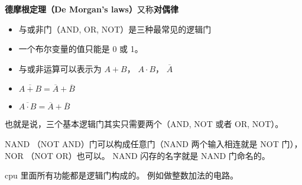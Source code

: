 
\begin{issues}
\issueDraft
\end{issues}

\textbf{德摩根定理（De Morgan's laws）}又称\textbf{对偶律}

\begin{itemize}
\item 与或非门（AND, OR, NOT）是三种最常见的逻辑门
\item 一个布尔变量的值只能是 0 或 1。
\item 与或非运算可以表示为 $A + B$， $A\cdot B$， $\overline A$
\item $\overline{A+B} = \overline A + \overline B$
\item $\overline{A \cdot B} = \overline A + \overline B$
\end{itemize}

也就是说，三个基本逻辑门其实只需要两个（AND, NOT 或者 OR, NOT）。

NAND （NOT AND）门可以构成任意门（NAND 两个输入相连就是 NOT 门）， NOR （NOT OR）也可以。 NAND 闪存的名字就是 NAND 门命名的。

cpu 里面所有功能都是逻辑门构成的。 例如做整数加法的电路。
